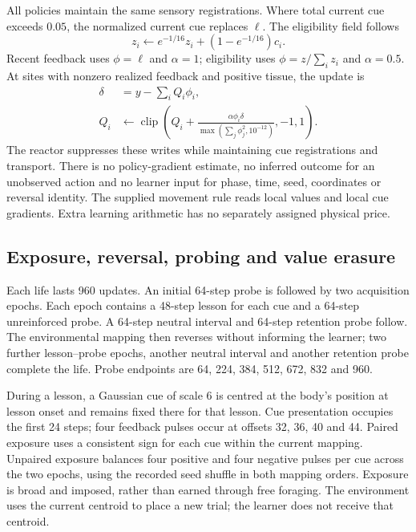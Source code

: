 All policies maintain the same sensory registrations. Where total current cue exceeds $0.05$, the normalized current cue replaces $\ell$. The eligibility field follows
\begin{equation}
z_i\leftarrow e^{-1/16}z_i+(1-e^{-1/16})c_i.
\end{equation}
Recent feedback uses $\phi=\ell$ and $\alpha=1$; eligibility uses $\phi=z/\sum_i z_i$ and $\alpha=0.5$. At sites with nonzero realized feedback and positive tissue, the update is
\begin{align}
\delta &=y-\sum_i Q_i\phi_i,\\
Q_i&\leftarrow\operatorname{clip}\left(Q_i+
\frac{\alpha\phi_i\delta}{\max(\sum_j\phi_j^2,10^{-12})},-1,1\right).
\end{align}
The reactor suppresses these writes while maintaining cue registrations and transport. There is no policy-gradient estimate\cite{williams,baxter}, no inferred outcome for an unobserved action and no learner input for phase, time, seed, coordinates or reversal identity. The supplied movement rule reads local values and local cue gradients. Extra learning arithmetic has no separately assigned physical price.


\subsection*{Exposure, reversal, probing and value erasure}

Each life lasts 960 updates. An initial 64-step probe is followed by two acquisition epochs. Each epoch contains a 48-step lesson for each cue and a 64-step unreinforced probe. A 64-step neutral interval and 64-step retention probe follow. The environmental mapping then reverses without informing the learner; two further lesson--probe epochs, another neutral interval and another retention probe complete the life. Probe endpoints are 64, 224, 384, 512, 672, 832 and 960.

During a lesson, a Gaussian cue of scale 6 is centred at the body's position at lesson onset and remains fixed there for that lesson. Cue presentation occupies the first 24 steps; four feedback pulses occur at offsets 32, 36, 40 and 44. Paired exposure uses a consistent sign for each cue within the current mapping. Unpaired exposure balances four positive and four negative pulses per cue across the two epochs, using the recorded seed shuffle in both mapping orders. Exposure is broad and imposed, rather than earned through free foraging. The environment uses the current centroid to place a new trial; the learner does not receive that centroid.


